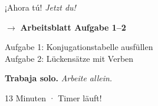 \documentclass[aspectratio=169, 11pt]{beamer}
\newcommand{\seriftext}[1]{{\fontfamily{ppl}\selectfont #1}}
\newcommand{\es}[1]{\seriftext{\textbf{#1}}}
\newcommand{\de}[1]{\textit{\textcolor{mittelgrau}{#1}}}
\newcommand{\abmark}[1]{{\Large$\rightarrow$ \textbf{Arbeitsblatt Aufgabe #1}}}
\newcommand{\zeit}[1]{{\small\textcolor{mittelgrau}{#1}}}
\begin{document}
\begin{frame}{¡Ahora tú! \de{Jetzt du!}}
    \vspace{1cm}

    \begin{center}
        \abmark{1--2}

        \vspace{0.8cm}

        {\large Aufgabe 1: Konjugationstabelle ausfüllen}\\
        {\large Aufgabe 2: Lückensätze mit Verben}

        \vspace{0.8cm}

        \es{Trabaja solo.} \de{Arbeite allein.}

        \vspace{0.5cm}

        \zeit{13 Minuten · Timer läuft!}
    \end{center}
\end{frame}

\end{document}
